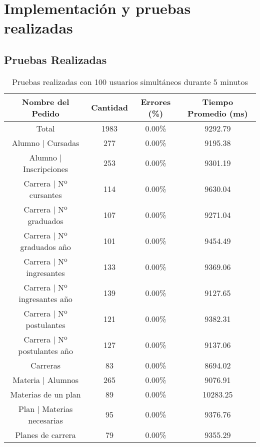 \chapter{Implementación y pruebas realizadas}
\label{sec:implementacion}

\section[Pruebas Realizadas]{Pruebas Realizadas}

\begin{table}[]
    \centering
    \makegapedcells
    \begin{tabular}{|c|c|c|c|}
    \hline
    Nombre del Pedido & Cantidad & Errores (\%) & Tiempo Promedio (ms) \\ \hline
    Total & 1983 & 0.00\% & 9292.79 \\ \hline
    Alumno | Cursadas & 277 & 0.00\% & 9195.38 \\ \hline
    Alumno | Inscripciones & 253 & 0.00\% & 9301.19\\ \hline
    Carrera | Nº cursantes & 114 & 0.00\% & 9630.04\\ \hline
    Carrera | Nº graduados & 107 & 0.00\% & 9271.04\\ \hline
    Carrera | Nº graduados año & 101 & 0.00\% & 9454.49\\ \hline
    Carrera | Nº ingresantes & 133 & 0.00\% & 9369.06\\ \hline
    Carrera | Nº ingresantes año & 139 & 0.00\% & 9127.65\\ \hline
    Carrera | Nº postulantes & 121 & 0.00\% & 9382.31\\ \hline
    Carrera | Nº postulantes año & 127 & 0.00\% & 9137.06\\ \hline
    Carreras & 83 & 0.00\% & 8694.02\\ \hline
    Materia | Alumnos & 265 & 0.00\% & 9076.91\\ \hline
    Materias de un plan & 89 & 0.00\% & 10283.25\\ \hline
    Plan | Materias necesarias & 95 & 0.00\% & 9376.76\\ \hline
    Planes de carrera & 79 & 0.00\% & 9355.29\\ \hline

    \end{tabular}
    \caption{Pruebas realizadas con 100 usuarios simultáneos durante 5 minutos}
    \label{tab:tabla_planes}
\end{table}


